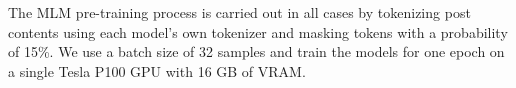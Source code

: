 \documentclass[11pt]{article}
\begin{document}
The MLM pre-training process is carried out in all cases by tokenizing post contents using each model's own tokenizer and masking tokens with a probability of 15\%. We use a batch size of 32 samples and train the models for one epoch on a single Tesla P100 GPU with 16 GB of VRAM.
\end{document}
